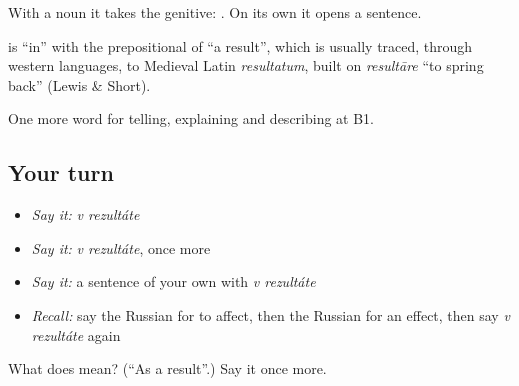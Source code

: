 With a noun it takes the genitive: \emph{  }. On its own it opens a sentence.

\begin{cousinweb}
\textbf{ } is \emph{} \textquotedblleft{}in\textquotedblright{} with the prepositional of \emph{} \textquotedblleft{}a result\textquotedblright{}, which is usually traced, through western languages, to Medieval Latin \emph{resultatum}, built on \emph{resultāre} \textquotedblleft{}to spring back\textquotedblright{} (Lewis \& Short).
\end{cousinweb}

\begin{grammarlens}[title={What you've built}]
One more word for telling, explaining and describing at B1.
\end{grammarlens}

\subsection*{Your turn}
\begin{itemize}
\raggedright
  \item \emph{Say it:} \emph{v rezultáte}
  \item \emph{Say it:} \emph{v rezultáte}, once more
  \item \emph{Say it:} a sentence of your own with \emph{v rezultáte}
  \item \emph{Recall:} say the Russian for to affect, then the Russian for an effect, then say \emph{v rezultáte} again
\end{itemize}

\begin{tcolorbox}[breakable,colback=teal!4,colframe=teal!35!black,title={Before you move on}]
What does   mean? (\textquotedblleft{}As a result\textquotedblright{}.) Say it once more.
\end{tcolorbox}
